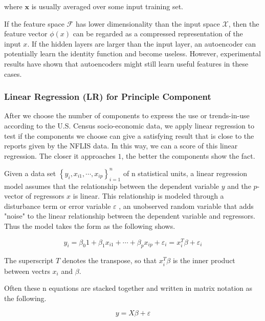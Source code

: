 \documentclass{mcmthesis}
\begin{document}
where $\mathbf {x}$  is usually averaged over some input training set.

If the feature space $\mathcal {F}$ has lower dimensionality than the input space $\mathcal {X}$, then the feature vector $\phi (x)$ can be regarded as a compressed representation of the input $x$. If the hidden layers are larger than the input layer, an autoencoder can potentially learn the identity function and become useless. However, experimental results have shown that autoencoders might still learn useful features in these cases.

\subsubsection{Linear Regression (LR) for Principle Component}
After we choose the number of components to express the use or trends-in-use according to the U.S. Census socio-economic data, we apply linear regression to test if the components we choose can give a satisfying result that is close to the reports given by the NFLIS data. In this way, we can a score of this linear regression. The closer it approaches $1$, the better the components show the fact.

Given a data set $\left \{ y_{i}, x_{i1}, \cdots , x_{ip} \right \}_{i = 1}^{n}$ of n statistical units, a linear regression model assumes that the relationship between the dependent variable $y$ and the $p$-vector of regressors $x$ is linear. This relationship is modeled through a disturbance term or error variable $ε$ , an unobserved random variable that adds "noise" to the linear relationship between the dependent variable and regressors. Thus the model takes the form  as the following shows.

\begin{equation}
    y_i = \beta_{0}1+ \beta_{1}x_{i1}+\cdots +\beta_{p}x_{ip} + \varepsilon _{i} = x_{i}^{T}\beta + \varepsilon_{i}
\end{equation}

The superscript $T$ denotes the transpose, so that $x_{i}^{T}\beta$ is the inner product between vectrs $x_{i}$ and $\beta$. 

Often these n equations are stacked together and written in matrix notation as the following.

\begin{equation}
    y = X\beta + \varepsilon
\end{equation}
\end{document}
